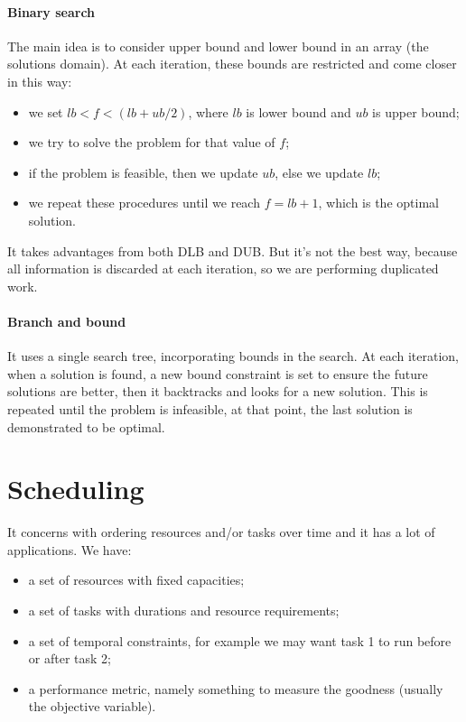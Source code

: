 \documentclass[10pt,a4paper]{article}
\begin{document}
\paragraph{Binary search}
The main idea is to consider upper bound and lower bound in an array (the
solutions domain). At each iteration, these bounds are restricted and come
closer in this way:
\begin{itemize}
    \item we set $lb < f < (lb + ub / 2)$, where $lb$ is lower bound and $ub$ is
    upper bound;
    \item we try to solve the problem for that value of $f$;
    \item if the problem is feasible, then we update $ub$, else we update $lb$;
    \item we repeat these procedures until we reach $f = lb + 1$, which is the
    optimal solution.
\end{itemize}
It takes advantages from both DLB and DUB. But it's not the best way, because
all information is discarded at each iteration, so we are performing duplicated
work.

\paragraph{Branch and bound}
It uses a single search tree, incorporating bounds in the search. At each
iteration, when a solution is found, a new bound constraint is set to ensure the
future solutions are better, then it backtracks and looks for a new solution.
This is repeated until the problem is infeasible, at that point, the last
solution is demonstrated to be optimal.

\section{Scheduling}
It concerns with ordering resources and/or tasks over time and it has a lot of
applications. We have:
\begin{itemize}
    \item a set of resources with fixed capacities;
    \item a set of tasks with durations and resource requirements;
    \item a set of temporal constraints, for example we may want task 1 to run
    before or after task 2;
    \item a performance metric, namely something to measure the goodness
    (usually the objective variable).
\end{itemize}
\end{document}
